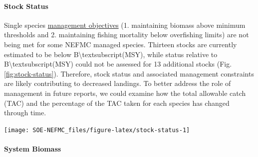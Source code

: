 \documentclass[
  10pt,
]{article}
\let\origfigure\figure
\let\endorigfigure\endfigure
\renewenvironment{figure}[1][2] {
    \expandafter\origfigure\expandafter[H]
} {
    \endorigfigure
}
\begin{document}
\hypertarget{stock-status}{%
\paragraph{Stock Status}\label{stock-status}}

Single species \href{https://noaa-edab.github.io/catalog/stock-status.html}{management objectives} (1. maintaining biomass above minimum thresholds and 2. maintaining fishing mortality below overfishing limits) are not being met for some NEFMC managed species. Thirteen stocks are currently estimated to be below B\textbackslash textsubscript(MSY), while status relative to B\textbackslash textsubscript(MSY) could not be assessed for 13 additional stocks (Fig.\ref{fig:stock-status}). Therefore, stock status and associated management constraints are likely contributing to decreased landings. To better address the role of management in future reports, we could examine how the total allowable catch (TAC) and the percentage of the TAC taken for each species has changed through time.

\begin{figure}

{\centering \texttt{[image: SOE-NEFMC\_files/figure-latex/stock-status-1]} 

}

\caption{Summary of single species status for NEFMC and jointly federally managed stocks (goosefish and spiny dogfish).  The dotted vertical line at one is the target biomass reference point of B.  The dashed lines are the management thresholds of B (vertical) or F (horizontal). Colors denote stocks with B/B\textsubscript{MSY} < 0.5 or F/F\textsubscript{MSY} (orange), stocks 0.5<B/B\textsubscript{MSY}<1 (blue), and stocks B/B\textsubscript{MSY}>1 (green).}\label{fig:stock-status}
\end{figure}

\hypertarget{system-biomass}{%
\paragraph{System Biomass}\label{system-biomass}}
\end{document}

